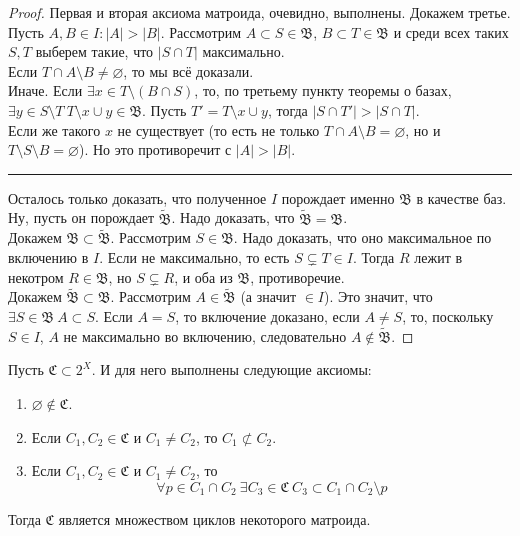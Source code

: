\documentclass{article}
\begin{document}
    \begin{proof}
        Первая и вторая аксиома матроида, очевидно, выполнены. Докажем третье. Пусть $A,B\in I:|A|>|B|$. Рассмотрим $A\subset S\in\mathfrak B$, $B\subset T\in\mathfrak B$ и среди всех таких $S,T$ выберем такие, что $|S\cap T|$ максимально.\\
        Если $T\cap A\setminus B\neq\varnothing$, то мы всё доказали.\\
        Иначе. Если $\exists x\in T\setminus(B\cap S)$, то, по третьему пункту теоремы о базах, $\exists y\in S\setminus T~T\setminus x\cup y\in\mathfrak B$. Пусть $T'=T\setminus x\cup y$, тогда $|S\cap T'|>|S\cap T|$.\\
        Если же такого $x$ не существует (то есть не только $T\cap A\setminus B=\varnothing$, но и $T\setminus S\setminus B=\varnothing$). Но это противоречит с $|A|>|B|$.\hrule
        Осталось только доказать, что полученное $I$ порождает именно $\mathfrak B$ в качестве баз. Ну, пусть он порождает $\tilde{\mathfrak B}$. Надо доказать, что $\tilde{\mathfrak B}=\mathfrak B$.\\
        Докажем $\mathfrak B\subset\tilde{\mathfrak B}$. Рассмотрим $S\in\mathfrak B$. Надо доказать, что оно максимальное по включению в $I$. Если не максимально, то есть $S\subsetneq T\in I$. Тогда $R$ лежит в некотром $R\in\mathfrak B$, но $S\subsetneq R$, и оба из $\mathfrak B$, противоречие.\\
        Докажем $\tilde{\mathfrak B}\subset\mathfrak B$. Рассмотрим $A\in\tilde{\mathfrak B}$ (а значит $\in I$). Это значит, что $\exists S\in\mathfrak B~A\subset S$. Если $A=S$, то включение доказано, если $A\neq S$, то, поскольку $S\in I$, $A$ не максимально во включению, следовательно $A\notin\tilde{\mathfrak B}$.
    \end{proof}
    \begin{theorem}
        Пусть $\mathfrak C\subset 2^X$. И для него выполнены следующие аксиомы:
        \begin{enumerate}
            \item $\varnothing\notin\mathfrak C$.
            \item Если $C_1,C_2\in\mathfrak C$ и $C_1\neq C_2$, то $C_1\not\subset C_2$.
            \item Если $C_1,C_2\in\mathfrak C$ и $C_1\neq C_2$, то
            $$
            \forall p\in C_1\cap C_2~\exists C_3\in\mathfrak C~C_3\subset C_1\cap C_2\setminus p
            $$
        \end{enumerate}
        Тогда $\mathfrak C$ является множеством циклов некоторого матроида.
    \end{theorem}
\end{document}
